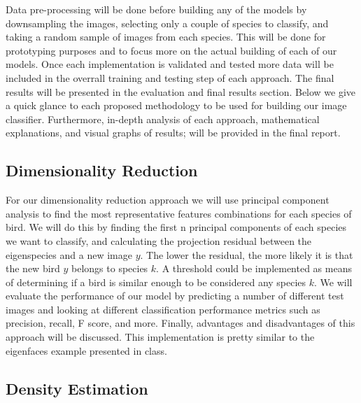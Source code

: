 \documentclass[11pt]{article}
\begin{document}
\begin{singlespace}
Data pre-processing will be done before building any of the models by downsampling the images, selecting only a couple of species to classify, and taking a random sample of images from each species. This will be done for prototyping purposes and to focus more on the actual building of each of our models. Once each implementation is validated and tested more data will be included in the overrall training and testing step of each approach. The final results will be presented in the evaluation and final results section. Below we give a quick glance to each proposed methodology to be used for building our image classifier. Furthermore, in-depth analysis of each approach, mathematical explanations, and visual graphs of results; will be provided in the final report. 

\subsection{Dimensionality Reduction}
For our dimensionality reduction approach we will use principal component analysis to find the most representative features combinations for each species of bird.   We will do this by finding the first n principal components of each species we want to classify, and calculating the projection residual between the eigenspecies and a new image $y$. The lower the residual, the more likely it is that the new bird $y$ belongs to species $k$. A threshold could be implemented as means of determining if a bird is similar enough to be considered any species $k$. We will evaluate the performance of our model by predicting a number of different test images and looking at different classification performance metrics such as precision, recall, F score, and more. Finally, advantages and disadvantages of this approach will be discussed. This implementation is pretty similar to the eigenfaces example presented in class. 

\subsection{Density Estimation}


\end{singlespace}
\end{document}
